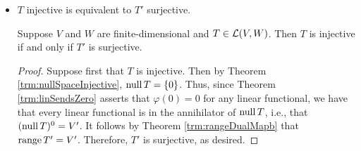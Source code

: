 \documentclass[../main.tex]{subfiles}
\begin{document}
\begin{itemize}
\begin{theorem}
\begin{enumerate}[label={\textup{(}\alph*\textup{)}},ref={\thetheorem\alph*}]
\begin{proof}
\begin{align*}
                    &= \dim\range T\tag*{Theorem \ref{trm:dimAnnihilator}}
                \end{align*}
                as desired.
            \end{proof}
            \item \label{trm:rangeDualMapb}$\range T'=(\nul T)^0$.
            \begin{proof}
                First, let $\varphi\in\range T'$ be arbitrary. Then there exists $\psi\in W'$ such that $\varphi=T'(\psi)$. Now let $v\in\nul T$ be arbitrary. It follows that
                \begin{equation*}
                    \varphi(v) = (T'(\psi))(v) = (\psi\circ T)(v) = \psi(Tv) = \psi(0) = 0
                \end{equation*}
                Therefore, $\varphi\in(\nul T)^0$, as desired.\par
                Second, we have that
                \begin{align*}
                    \dim\range T' &= \dim\range T\tag*{Theorem \ref{trm:rangeDualMapa}}\\
                    &= \dim V-\dim\nul T\tag*{\hyperref[trm:fundamentalTheoremLinearMaps]{Fundamental Theorem of Linear Maps}}\\
                    &= \dim(\nul T)^0\tag*{Theorem \ref{trm:dimAnnihilator}}
                \end{align*}\par
                Therefore, since Theorem \ref{trm:rangeSpace} implies that $\range T'$ is a subspace of $(\nul T)^0$ and $\dim\range T'=\dim(\nul T)^0$, Exercise \ref{exr:subspaceSameDim} asserts that $\range T'=(\nul T)^0$, as desired.
            \end{proof}
        \end{enumerate}
    \end{theorem}
    \item $T$ injective is equivalent to $T'$ surjective.
    \begin{theorem}
        Suppose $V$ and $W$ are finite-dimensional and $T\in\mathcal{L}(V,W)$. Then $T$ is injective if and only if $T'$ is surjective.
        \begin{proof}
            Suppose first that $T$ is injective. Then by Theorem \ref{trm:nullSpaceInjective}, $\operatorname{null} T=\{0\}$. Thus, since Theorem \ref{trm:linSendsZero} asserts that $\varphi(0)=0$ for any linear functional, we have that every linear functional is in the annihilator of $\operatorname{null} T$, i.e., that $(\operatorname{null} T)^0=V'$. It follows by Theorem \ref{trm:rangeDualMapb} that $\operatorname{range} T'=V'$. Therefore, $T'$ is surjective, as desired.\par

\end{proof}
\end{theorem}
\end{itemize}
\end{document}
